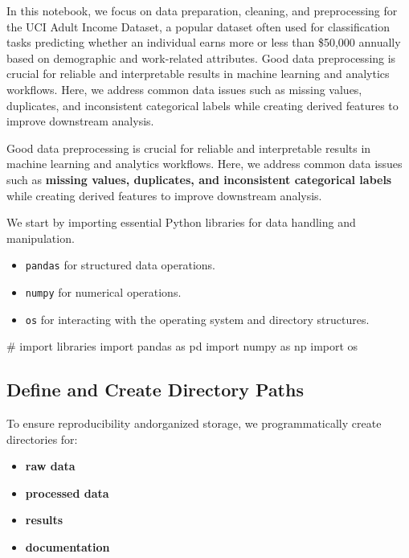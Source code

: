 \documentclass[
  letterpaper,
  DIV=11,
  numbers=noendperiod]{scrartcl}
\author{}
\date{}
\newenvironment{Shaded}{\begin{snugshade}}{\end{snugshade}}
\newcommand{\CommentTok}[1]{\textcolor[rgb]{0.37,0.37,0.37}{#1}}
\newcommand{\ImportTok}[1]{\textcolor[rgb]{0.00,0.46,0.62}{#1}}
\newcommand{\NormalTok}[1]{\textcolor[rgb]{0.00,0.23,0.31}{#1}}
\providecommand{\tightlist}{%
  \setlength{\itemsep}{0pt}\setlength{\parskip}{0pt}}
\begin{document}
In this notebook, we focus on data preparation, cleaning, and
preprocessing for the UCI Adult Income Dataset, a popular dataset often
used for classification tasks predicting whether an individual earns
more or less than \$50,000 annually based on demographic and
work-related attributes. Good data preprocessing is crucial for reliable
and interpretable results in machine learning and analytics workflows.
Here, we address common data issues such as missing values, duplicates,
and inconsistent categorical labels while creating derived features to
improve downstream analysis.

Good data preprocessing is crucial for reliable and interpretable
results in machine learning and analytics workflows. Here, we address
common data issues such as \textbf{missing values, duplicates, and
inconsistent categorical labels} while creating derived features to
improve downstream analysis.

We start by importing essential Python libraries for data handling and
manipulation.

\begin{itemize}
\item
  \texttt{pandas} for structured data operations.
\item
  \texttt{numpy} for numerical operations.
\item
  \texttt{os} for interacting with the operating system and directory
  structures.
\end{itemize}

\begin{Shaded}
\begin{Highlighting}[]
\CommentTok{\# import libraries}
\ImportTok{import}\NormalTok{ pandas }\ImportTok{as}\NormalTok{ pd }
\ImportTok{import}\NormalTok{ numpy }\ImportTok{as}\NormalTok{ np  }
\ImportTok{import}\NormalTok{ os}
\end{Highlighting}
\end{Shaded}

\subsection{Define and Create Directory
Paths}\label{define-and-create-directory-paths}

To ensure reproducibility andorganized storage, we programmatically
create directories for:

\begin{itemize}
\tightlist
\item
  \textbf{raw data}
\item
  \textbf{processed data}
\item
  \textbf{results}
\item
  \textbf{documentation}
\end{itemize}
\end{document}
